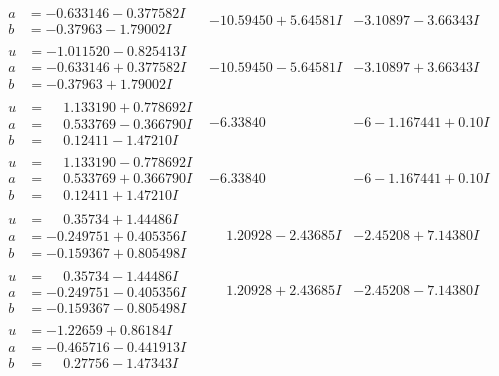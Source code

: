 \documentclass[1p]{elsarticle_modified}
\theoremstyle{definition}
\begin{document}
$$\begin{array}{c|c|c}
\begin{aligned}
a &= -0.633146 - 0.377582 I \\
b &= -0.37963 - 1.79002 I\end{aligned}
 & -10.59450 + 5.64581 I & -3.10897 - 3.66343 I \\ \hline\begin{aligned}
u &= -1.011520 - 0.825413 I \\
a &= -0.633146 + 0.377582 I \\
b &= -0.37963 + 1.79002 I\end{aligned}
 & -10.59450 - 5.64581 I & -3.10897 + 3.66343 I \\ \hline\begin{aligned}
u &= \phantom{-}1.133190 + 0.778692 I \\
a &= \phantom{-}0.533769 - 0.366790 I \\
b &= \phantom{-}0.12411 - 1.47210 I\end{aligned}
 & -6.33840\phantom{ +0.000000I} &                  -6
-1.167441 + 0. 10   I\phantom{ +0.000000I} \\ \hline\begin{aligned}
u &= \phantom{-}1.133190 - 0.778692 I \\
a &= \phantom{-}0.533769 + 0.366790 I \\
b &= \phantom{-}0.12411 + 1.47210 I\end{aligned}
 & -6.33840\phantom{ +0.000000I} &                  -6
-1.167441 + 0. 10   I\phantom{ +0.000000I} \\ \hline\begin{aligned}
u &= \phantom{-}0.35734 + 1.44486 I \\
a &= -0.249751 + 0.405356 I \\
b &= -0.159367 + 0.805498 I\end{aligned}
 & \phantom{-}1.20928 - 2.43685 I & -2.45208 + 7.14380 I \\ \hline\begin{aligned}
u &= \phantom{-}0.35734 - 1.44486 I \\
a &= -0.249751 - 0.405356 I \\
b &= -0.159367 - 0.805498 I\end{aligned}
 & \phantom{-}1.20928 + 2.43685 I & -2.45208 - 7.14380 I \\ \hline\begin{aligned}
u &= -1.22659 + 0.86184 I \\
a &= -0.465716 - 0.441913 I \\
b &= \phantom{-}0.27756 - 1.47343 I\end{aligned}

\end{array}$$
\end{document}
